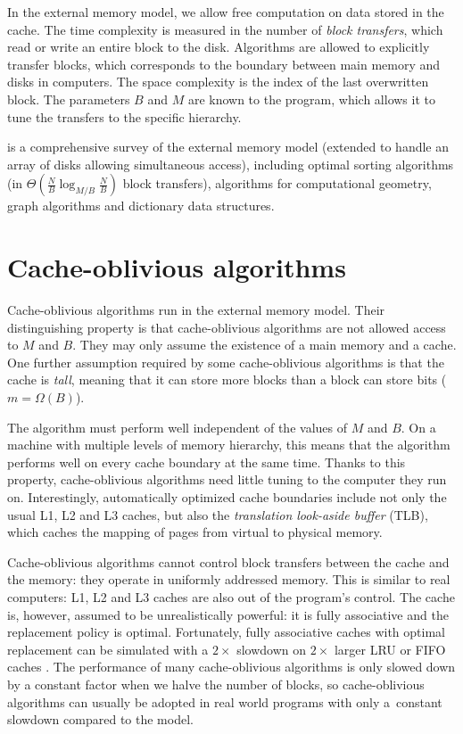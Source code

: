 In the external memory model, we allow free computation on data
stored in the cache. The time complexity is measured in the number of
\emph{block transfers}, which read or write an entire block to the disk.
Algorithms are allowed to explicitly transfer blocks, which corresponds
to the boundary between main memory and disks in computers.
The space complexity is the index of the last overwritten block.
The parameters $B$ and $M$ are known to the program, which allows it to tune
the transfers to the specific hierarchy.

\cite{em-ads} is a comprehensive survey of the external memory model
(extended to handle an array of disks allowing simultaneous access), including
optimal sorting algorithms (in $\Theta(\frac{N}{B}\log_{M/B}\frac{N}{B})$
block transfers), algorithms for computational geometry, graph algorithms
and dictionary data structures.

\section{Cache-oblivious algorithms}
Cache-oblivious algorithms run in the external memory model.
Their distinguishing property is that cache-oblivious algorithms
are not allowed access to $M$ and $B$. They may only assume the existence
of a main memory and a cache.
One further assumption required by some cache-oblivious algorithms is
that the cache is \emph{tall}, meaning that it can store more blocks
than a block can store bits ($m=\Omega(B)$).

The algorithm must perform well independent of the values of $M$ and $B$.
On a machine with multiple levels of memory hierarchy, this means that
the algorithm performs well on every cache boundary at the same time.
Thanks to this property, cache-oblivious algorithms need little tuning to the
computer they run on. Interestingly, automatically optimized cache boundaries
include not only the usual L1, L2 and L3 caches, but also the \emph{translation
look-aside buffer} (TLB), which caches the mapping of pages from virtual to
physical memory.

Cache-oblivious algorithms cannot control block transfers between the cache
and the memory: they operate in uniformly addressed memory. This is similar
to real computers: L1, L2 and L3 caches are also out of the program's control.
The cache is, however, assumed to be unrealistically powerful: it is fully
associative and the replacement policy is optimal. Fortunately, fully
associative caches with optimal replacement can be simulated with a
$2\times$ slowdown on $2\times$ larger LRU or FIFO caches
\cite{sleator1985amortized}.
The performance of many cache-oblivious algorithms is only slowed down
by a constant factor when we halve the number of blocks, so cache-oblivious
algorithms can usually be adopted in real world programs with only a~constant
slowdown compared to the model.

